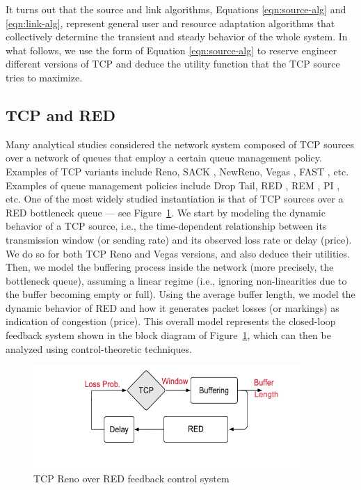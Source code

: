 \documentclass{article}
\begin{document}
It turns out that the source and link algorithms, Equations \ref{eqn:source-alg} and \ref{eqn:link-alg},
represent general user and resource adaptation algorithms that collectively determine 
the transient and steady behavior of the whole system.
In what follows, we use the form of Equation \ref{eqn:source-alg} to reserve engineer different versions
of TCP and deduce the utility function that the TCP source tries to maximize.


\subsection{TCP and RED}
 
Many analytical studies considered the network system composed of TCP sources over a network of queues that employ a certain queue management policy. Examples of TCP variants include Reno, SACK \cite{Fall:1996}, NewReno, Vegas \cite{vegas:1995}, FAST \cite{fast:2006}, etc. Examples of queue management policies include Drop Tail, RED \cite{red:1993}, REM \cite{REM:2001}, PI \cite{PI:2000}, etc. One of the most widely studied instantiation is that of TCP sources over a RED bottleneck queue --- see Figure~\ref{fig:TCP-RED-diagram}.
We start by modeling the dynamic behavior of a TCP source, i.e., 
the time-dependent relationship between its transmission window (or sending rate) and 
its observed loss rate or delay (price).
We do so for both TCP Reno and Vegas versions, and also deduce their utilities.
Then, we model the buffering process inside the network (more precisely, the bottleneck queue),
assuming a linear regime (i.e., ignoring non-linearities due to the buffer becoming empty or full).
Using the average buffer length, we model the dynamic behavior of RED and how 
it generates packet losses (or markings) as indication of congestion (price).
This overall model represents the closed-loop feedback system shown in 
the block diagram of Figure~\ref{fig:TCP-RED-diagram}, 
which can then be analyzed using control-theoretic techniques.
\begin{figure}[htbp]
   \centering
   \includegraphics[width=4in]{figures/tcp-red.jpg} %
   \caption{TCP Reno over RED feedback control system}
   \label{fig:TCP-RED-diagram}
\end{figure}
\end{document}
